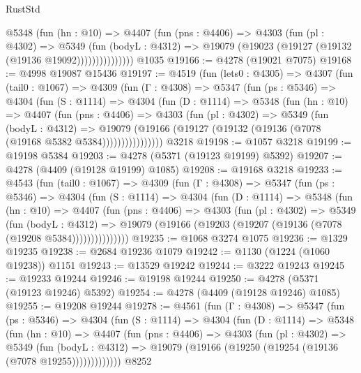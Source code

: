 \begin{lexlean}{RustStd}
\begin{coremodule}
                @5348
                  (fun (hn : @10) =>
                  @4407
                    (fun (pns : @4406) =>
                    @4303
                      (fun (pl : @4302) =>
                      @5349
                        (fun (bodyL : @4312) =>
                        @19079 (@19023 (@19127 (@19132 (@19136 @19092)))))))))))))))
    @1035
@19166 := @4278 (@19021 @7075)
@19168 := @4998 @19087 @15436
@19197 := @4519
    (fun (lets0 : @4305) =>
    @4307
      (fun (tail0 : @1067) =>
      @4309
        (fun (Γ : @4308) =>
        @5347
          (fun (ps : @5346) =>
          @4304
            (fun (S : @1114) =>
            @4304
              (fun (D : @1114) =>
              @5348
                (fun (hn : @10) =>
                @4407
                  (fun (pns : @4406) =>
                  @4303
                    (fun (pl : @4302) =>
                    @5349
                      (fun (bodyL : @4312) =>
                      @19079
                        (@19166 (@19127 (@19132 (@19136 (@7078 (@19168 @5382 @5384))))))))))))))))
    @3218
@19198 := @1057 @3218
@19199 := @19198 @5384
@19203 := @4278 (@5371 (@19123 @19199) @5392)
@19207 := @4278 (@4409 (@19128 @19199) @1085)
@19208 := @19168 @3218
@19233 := @4543
    (fun (tail0 : @1067) =>
    @4309
      (fun (Γ : @4308) =>
      @5347
        (fun (ps : @5346) =>
        @4304
          (fun (S : @1114) =>
          @4304
            (fun (D : @1114) =>
            @5348
              (fun (hn : @10) =>
              @4407
                (fun (pns : @4406) =>
                @4303
                  (fun (pl : @4302) =>
                  @5349
                    (fun (bodyL : @4312) =>
                    @19079 (@19166 (@19203 (@19207 (@19136 (@7078 (@19208 @5384)))))))))))))))
@19235 := @1068 @3274 @1075
@19236 := @1329 @19235
@19238 := @2684 @19236 @1079
@19242 := @1130 (@1224 (@1060 @19238)) @1151
@19243 := @13529 @19242
@19244 := @3222 @19243
@19245 := @19233 @19244
@19246 := @19198 @19244
@19250 := @4278 (@5371 (@19123 @19246) @5392)
@19254 := @4278 (@4409 (@19128 @19246) @1085)
@19255 := @19208 @19244
@19278 := @4561
    (fun (Γ : @4308) =>
    @5347
      (fun (ps : @5346) =>
      @4304
        (fun (S : @1114) =>
        @4304
          (fun (D : @1114) =>
          @5348
            (fun (hn : @10) =>
            @4407
              (fun (pns : @4406) =>
              @4303
                (fun (pl : @4302) =>
                @5349
                  (fun (bodyL : @4312) =>
                  @19079 (@19166 (@19250 (@19254 (@19136 (@7078 @19255)))))))))))))
    @8252

\end{coremodule}
\end{lexlean}
